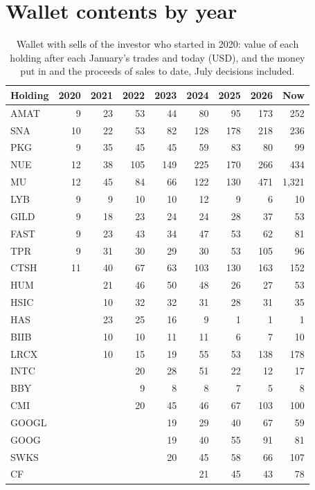 \documentclass[11pt,a4paper]{article}
\begin{document}
\section{Wallet contents by year}
\label{app:contents}
\begin{table}[H]
\centering
\small
\caption{Wallet with sells of the investor who started in 2020: value of each holding after each January's trades and today (USD), and the money put in and the proceeds of sales to date, July decisions included.}\label{tab:contents}
\begin{tabular}{l r r r r r r r r }
\hline
Holding & 2020 & 2021 & 2022 & 2023 & 2024 & 2025 & 2026 & Now \\
\hline
AMAT & 9 & 23 & 53 & 44 & 80 & 95 & 173 & 252 \\
SNA & 10 & 22 & 53 & 82 & 128 & 178 & 218 & 236 \\
PKG & 9 & 35 & 45 & 45 & 59 & 83 & 80 & 99 \\
NUE & 12 & 38 & 105 & 149 & 225 & 170 & 266 & 434 \\
MU & 12 & 45 & 84 & 66 & 122 & 130 & 471 & 1,321 \\
LYB & 9 & 9 & 10 & 10 & 12 & 9 & 6 & 10 \\
GILD & 9 & 18 & 23 & 24 & 24 & 28 & 37 & 53 \\
FAST & 9 & 23 & 43 & 34 & 47 & 53 & 62 & 81 \\
TPR & 9 & 31 & 30 & 29 & 30 & 53 & 105 & 96 \\
CTSH & 11 & 40 & 67 & 63 & 103 & 130 & 163 & 152 \\
HUM &  & 21 & 46 & 50 & 48 & 26 & 27 & 53 \\
HSIC &  & 10 & 32 & 32 & 31 & 28 & 31 & 35 \\
HAS &  & 23 & 25 & 16 & 9 & 1 & 1 & 1 \\
BIIB &  & 10 & 10 & 11 & 11 & 6 & 7 & 10 \\
LRCX &  & 10 & 15 & 19 & 55 & 53 & 138 & 178 \\
INTC &  &  & 20 & 28 & 51 & 22 & 12 & 17 \\
BBY &  &  & 9 & 8 & 8 & 7 & 5 & 8 \\
CMI &  &  & 20 & 45 & 46 & 67 & 103 & 100 \\
GOOGL &  &  &  & 19 & 29 & 40 & 67 & 59 \\
GOOG &  &  &  & 19 & 40 & 55 & 91 & 81 \\
SWKS &  &  &  & 20 & 45 & 58 & 66 & 107 \\
CF &  &  &  &  & 21 & 45 & 43 & 78 \\

\end{tabular}
\end{table}
\end{document}
